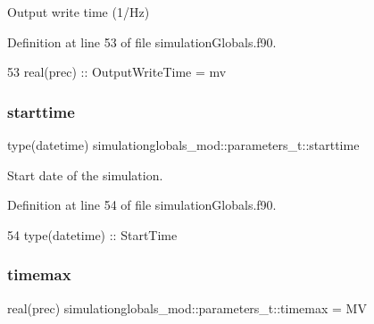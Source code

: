 Output write time (1/\+Hz) 



Definition at line 53 of file simulation\+Globals.\+f90.


\begin{DoxyCode}
53         \textcolor{keywordtype}{real(prec)}      :: OutputWriteTime = mv              
\end{DoxyCode}
\mbox{\label{structsimulationglobals__mod_1_1parameters__t_a204cdccb6f9cd2fa137210a7f28f676d}} 
\subsubsection{\texorpdfstring{starttime}{starttime}}
{\footnotesize\ttfamily type(datetime) simulationglobals\+\_\+mod\+::parameters\+\_\+t\+::starttime\hspace{0.3cm}{\ttfamily [private]}}



Start date of the simulation. 



Definition at line 54 of file simulation\+Globals.\+f90.


\begin{DoxyCode}
54         \textcolor{keywordtype}{type}(datetime)  :: StartTime
\end{DoxyCode}
\mbox{\label{structsimulationglobals__mod_1_1parameters__t_a196b29045b2a76de4a1a0efd8c587838}} 
\subsubsection{\texorpdfstring{timemax}{timemax}}
{\footnotesize\ttfamily real(prec) simulationglobals\+\_\+mod\+::parameters\+\_\+t\+::timemax = MV\hspace{0.3cm}{\ttfamily [private]}}



